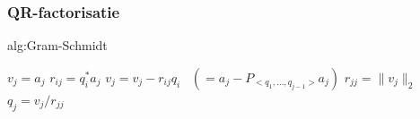 \subsubsection{QR-factorisatie}

\vspace{0.5cm}

\begin{alg}{alg:Gram-Schmidt}
    \vspace{-0.3cm}
    \begin{tcolorbox}[colback=white, colframe=gray, arc=0mm] 
        \begin{algorithmic}[1]
            \State $v_j = a_j$
                \State $r_{ij} = q_i^* a_j$
                \State $v_j = v_j - r_{ij} q_i$ \ $(= a_j - P_{<q_1,\ldots,q_{j-1}>} a_j)$
            \EndFor
            \State $r_{jj} = \|v_j\|_2$
            \State $q_j = v_j / r_{jj}$
        \EndFor
        \end{algorithmic}
    \end{tcolorbox}
    \vspace{-0.3cm}
\end{alg}

